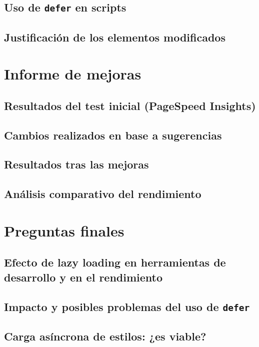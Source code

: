 \documentclass{article}
\begin{document}
\subsection{Uso de \texttt{defer} en scripts}\label{subsec:defer-en-scripts}

\subsection{Justificación de los elementos modificados}\label{subsec:justificacion}

\section{Informe de mejoras}\label{sec:informe-de-mejoras}

\subsection{Resultados del test inicial (PageSpeed Insights)}\label{subsec:resultados-del-test-inicial}

\subsection{Cambios realizados en base a sugerencias}\label{subsec:cambios-realizados}

\subsection{Resultados tras las mejoras}\label{subsec:resultados-tras-las-mejoras}

\subsection{Análisis comparativo del rendimiento}\label{subsec:analisis-comparativo}

\section{Preguntas finales}\label{sec:preguntas-finales}

\subsection{Efecto de lazy loading en herramientas de desarrollo y en el rendimiento}\label{subsec:efecto-de-lazy-loading}

\subsection{Impacto y posibles problemas del uso de \texttt{defer}}\label{subsec:impacto-y-problemas-de-defer}

\subsection{Carga asíncrona de estilos: ¿es viable?}\label{subsec:carga-asincrona-de-estilos}
\end{document}
